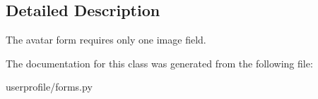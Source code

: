 \subsection{Detailed Description}
\begin{DoxyVerb}The avatar form requires only one image field.
\end{DoxyVerb}
 

The documentation for this class was generated from the following file\-:\begin{DoxyCompactItemize}
\item 
userprofile/forms.\-py\end{DoxyCompactItemize}
